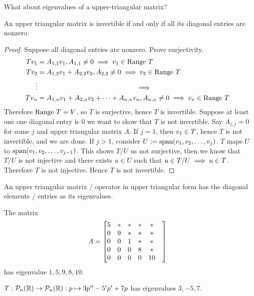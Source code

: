 \begin{question}
    What about eigenvalues of a upper-triangular matrix?
\end{question}
\begin{theorem}
    An upper triangular matrix is invertible if and only if all its diagonal entries are nonzero.
\end{theorem}
\begin{proof}
    Suppose all diagonal entries are nonzero. Prove surjectivity. 
    \begin{align*}
        Tv_1  &=A_{1,1} v_1, A_{1,1} \neq 0 \implies v_1 \in \range T\\
     Tv_2  &=A_{1,2} v_1 + A_{2,2} v_2 , A_{2,2} \neq 0 \implies v_2 \in \range T \\
     \vdots & \hspace{5cm} \implies \\
     Tv_n &= A_{1,n} v_1 + A_{2,n} v_2 + \cdots + A_{n,n} v_n, A_{n,n} \neq 0 \implies v_n \in \range T
    \end{align*} 
    Therefore $\text{Range } T = V$, so $T$ is surjective, hence $T$ is invertible. 
    Suppose at least one one diagonal entry is $0$ we want to show that $T$ is not invertible. Say $A_{j,j} = 0$ for some $j$ and upper triangular matrix $A$. If $j = 1$, then $v_1 \in \null T$, hence $T$ is not invertible, and we are done. If $j > 1$, consider $U := \text{span} ({v}_1,{v}_2, \ldots, {v}_{j})$. $T$ maps $U$ to $\text{span} ({v}_1,{v}_2, \ldots, {v}_{j-1})$. This shows $T/U$ us not surjective, then we know that $T/U$ is not injective and there exists $u \in U$ such that $u \in \null T/U \implies u \in \null T$. Therefore $T$ is not injective. Hence $T$ is not invertible.
\end{proof}
\begin{corollary}
    An upper triangular matrix / operator in upper triangular form has the diagonal elements / entries as its eigenvalues.
\end{corollary}
\begin{example}The matrix
    \[ A = \begin{bmatrix} 
5 & * & * & * & * & \\
0 & 9 & * & * & * & \\
0 & 0 & 1 & * & * & \\
0 & 0 & 0 & 8 & * & \\
0 & 0 & 0 & 0 & 10 & \\
\end{bmatrix}\]
has eigenvalue $1,5,9,8,10$.
\end{example}
\begin{example}
    $T: \mathcal P_n(\mathbb R) \to \mathcal P_n(\mathbb R) : p \mapsto 3p'' - 5'p' + 7p$ has eigenvalues $3,-5,7$.
\end{example}
